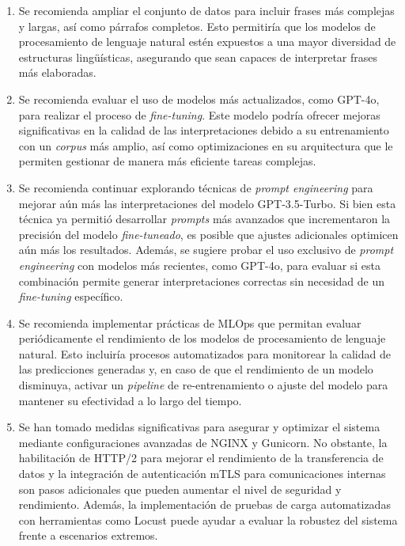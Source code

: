 \begin{enumerate}
\item Se recomienda ampliar el conjunto de datos para incluir frases más complejas y largas, así como párrafos completos. Esto permitiría que los modelos de procesamiento de lenguaje natural estén expuestos a una mayor diversidad de estructuras lingüísticas, asegurando que sean capaces de interpretar frases más elaboradas.

\item Se recomienda evaluar el uso de modelos más actualizados, como GPT-4o, para realizar el proceso de \textit{fine-tuning}. Este modelo podría ofrecer mejoras significativas en la calidad de las interpretaciones debido a su entrenamiento con un \textit{corpus} más amplio, así como optimizaciones en su arquitectura que le permiten gestionar de manera más eficiente tareas complejas. 

\item Se recomienda continuar explorando técnicas de \textit{prompt engineering} para mejorar aún más las interpretaciones del modelo GPT-3.5-Turbo. Si bien esta técnica ya permitió desarrollar \textit{prompts} más avanzados que incrementaron la precisión del modelo \textit{fine-tuneado}, es posible que ajustes adicionales optimicen aún más los resultados. Además, se sugiere probar el uso exclusivo de \textit{prompt engineering} con modelos más recientes, como GPT-4o, para evaluar si esta combinación permite generar interpretaciones correctas sin necesidad de un \textit{fine-tuning} específico.

\item Se recomienda implementar prácticas de MLOps que permitan evaluar periódicamente el rendimiento de los modelos de procesamiento de lenguaje natural. Esto incluiría procesos automatizados para monitorear la calidad de las predicciones generadas y, en caso de que el rendimiento de un modelo disminuya, activar un \textit{pipeline} de re-entrenamiento o ajuste del modelo para mantener su efectividad a lo largo del tiempo.


    \item Se han tomado medidas significativas para asegurar y optimizar el sistema mediante configuraciones avanzadas de NGINX y Gunicorn. No obstante, la habilitación de HTTP/2 para mejorar el rendimiento de la transferencia de datos y la integración de autenticación mTLS para comunicaciones internas son pasos adicionales que pueden aumentar el nivel de seguridad y rendimiento. Además, la implementación de pruebas de carga automatizadas con herramientas como Locust puede ayudar a evaluar la robustez del sistema frente a escenarios extremos.


\end{enumerate}
